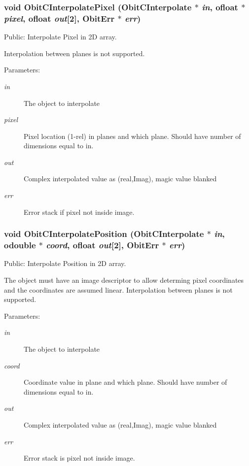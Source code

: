 \subsubsection{\setlength{\rightskip}{0pt plus 5cm}void Obit\-CInterpolate\-Pixel ({\bf Obit\-CInterpolate} $\ast$ {\em in}, {\bf ofloat} $\ast$ {\em pixel}, {\bf ofloat} {\em out}[2], {\bf Obit\-Err} $\ast$ {\em err})}\label{ObitCInterpolate_8c_a15}


Public: Interpolate Pixel in 2D array. 

Interpolation between planes is not supported. \begin{Desc}
\item[Parameters:]
\begin{description}
\item[{\em in}]The object to interpolate \item[{\em pixel}]Pixel location (1-rel) in planes and which plane. Should have number of dimensions equal to in. \item[{\em out}]Complex interpolated value as (real,Imag), magic value blanked \item[{\em err}]Error stack if pixel not inside image. \end{description}
\end{Desc}
\subsubsection{\setlength{\rightskip}{0pt plus 5cm}void Obit\-CInterpolate\-Position ({\bf Obit\-CInterpolate} $\ast$ {\em in}, {\bf odouble} $\ast$ {\em coord}, {\bf ofloat} {\em out}[2], {\bf Obit\-Err} $\ast$ {\em err})}\label{ObitCInterpolate_8c_a17}


Public: Interpolate Position in 2D array. 

The object must have an image descriptor to allow determing pixel coordinates and the coordinates are assumed linear. Interpolation between planes is not supported. \begin{Desc}
\item[Parameters:]
\begin{description}
\item[{\em in}]The object to interpolate \item[{\em coord}]Coordinate value in plane and which plane. Should have number of dimensions equal to in. \item[{\em out}]Complex interpolated value as (real,Imag), magic value blanked \item[{\em err}]Error stack is pixel not inside image. \end{description}
\end{Desc}
